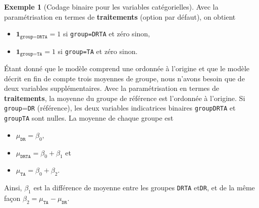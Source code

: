 \documentclass[
  11pt,
  letterpaper,
]{scrbook}
\providecommand{\tightlist}{%
  \setlength{\itemsep}{0pt}\setlength{\parskip}{0pt}}\usepackage{longtable,booktabs,array}
\theoremstyle{plain}
\theoremstyle{plain}
\theoremstyle{definition}
\newtheorem{example}{Exemple}[chapter]
\theoremstyle{definition}
\theoremstyle{remark}
\begin{document}
\begin{example}[Codage binaire pour les variables
catégorielles]
Avec la paramétrisation en termes de \textbf{traitements} (option par
défaut), on obtient

\begin{itemize}
\tightlist
\item
  \(\mathbf{1}_{\texttt{group}=\texttt{DRTA}}=1\) si \texttt{group=DRTA}
  et zéro sinon,
\item
  \(\mathbf{1}_{\texttt{group}=\texttt{TA}}=1\) si \texttt{group=TA} et
  zéro sinon.
\end{itemize}

Étant donné que le modèle comprend une ordonnée à l'origine et que le
modèle décrit en fin de compte trois moyennes de groupe, nous n'avons
besoin que de deux variables supplémentaires. Avec la paramétrisation en
termes de \textbf{traitements}, la moyenne du groupe de référence est
l'ordonnée à l'origine. Si \texttt{group}=\texttt{DR} (référence), les
deux variables indicatrices binaires \texttt{groupDRTA} et
\texttt{groupTA} sont nulles. La moyenne de chaque groupe est

\begin{itemize}
\tightlist
\item
  \(\mu_{\texttt{DR}} = \beta_0,\)
\item
  \(\mu_{\texttt{DRTA}}=\beta_0 + \beta_1\) et
\item
  \(\mu_{\texttt{TA}} = \beta_0 + \beta_2.\)
\end{itemize}

Ainsi, \(\beta_1\) est la différence de moyenne entre les groupes
\texttt{DRTA} et\texttt{DR}, et de la même façon
\(\beta_2=\mu_{\texttt{TA}}- \mu_{\texttt{DR}}.\)

\end{example}
\end{document}
